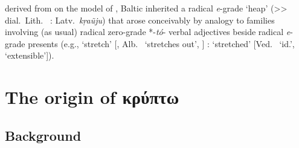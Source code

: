\documentclass[output=paper,colorlinks,citecolor=brown]{langscibook}
\begin{document}
 derived from  on the model of , Baltic inherited a radical \textit{e}-grade   ‘heap’ ({>}{>} dial.\ Lith.\  : Latv.\ \textit{k\c{r}aũju}) that arose conceivably by analogy to families involving (as usual) radical zero-grade *-\textit{tó}-  verbal adjectives beside radical \textit{e}-grade presents  (e.g.,  ‘stretch’ [, Alb.\  ‘stretches out’,  ] :  ‘stretched’ [Ved.\  ‘id.’,  ‘extensible’]).

\section{The origin of κρύπτω}
\subsection{Background}
\end{document}
